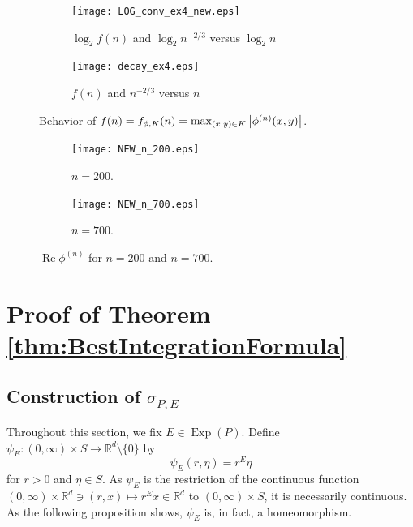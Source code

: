 \documentclass[11pt]{article}
\newenvironment{example}
  {\pushQED{\qed}\renewcommand{\qedsymbol}{$\triangle$}\examplex}
  {\popQED\endexamplex}
\theoremstyle{remark}
\renewcommand\Re{\operatorname{Re}}%
\newcommand\Exp{\operatorname{Exp}}
\begin{document}
\begin{example}
\begin{figure}[!htb]
    \begin{subfigure}{0.49\textwidth}
    \centering
    \texttt{[image: LOG\_conv\_ex4\_new.eps]}
    \caption{$\log_2 f(n)$ and $\log_2 n^{-2/3}$ versus $\log_2 n$}
    \end{subfigure}
    \begin{subfigure}{0.49\textwidth}
    \centering
    \texttt{[image: decay\_ex4.eps]}
    \caption{$f(n)$ and $n^{-2/3}$ versus $n$}
    \end{subfigure}
    \caption{Behavior of $f(n)=f_{\phi,K}(n)=\max_{(x,y)\in K}\abs{\phi^{(n)}(x,y)}$.}
    \label{fig:Conv_Pwr_5}
\end{figure}


\begin{figure}[!htb]
    \begin{subfigure}{0.49\textwidth}
    \centering
    \texttt{[image: NEW\_n\_200.eps]}
    \caption{$n = 200$.}
    \label{fig:Conv_Pwr_5a}
    \end{subfigure}
    \begin{subfigure}{0.49\textwidth}
    \centering
    \texttt{[image: NEW\_n\_700.eps]}
    \caption{$n = 700$.}
    \label{fig:Conv_Pwr_5b}
    \end{subfigure}
    \caption{$\Re{\phi^{(n)}}$ for $n = 200$ and $n=700$.}
    \label{fig:Conv_Pwr_50}
\end{figure}



\end{example}








\section{Proof of Theorem \ref{thm:BestIntegrationFormula}}\label{sec:ProofofBest}



\subsection{Construction of $\sigma_{P,E}$}\label{subsec:ConstructionofSigma}

Throughout this section, we fix $E\in\Exp(P)$. Define $\psi_E:(0,\infty)\times S\to\mathbb{R}^d\setminus\{0\}$ by
\begin{equation}\label{eq:Homeomorphism}
\psi_E(r,\eta)=r^E\eta
\end{equation}
for $r>0$ and $\eta\in S$. As $\psi_E$ is the restriction of the continuous function $(0,\infty)\times \mathbb{R}^d\ni (r,x)\mapsto r^E x\in\mathbb{R}^d$ to $(0,\infty)\times S$, it is necessarily continuous. As the following proposition shows, $\psi_E$ is, in fact, a homeomorphism.
\end{document}
